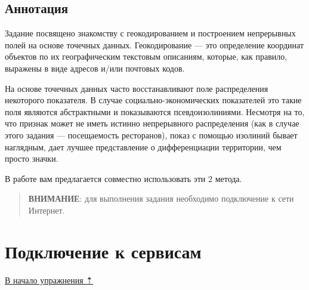 \documentclass[12pt,]{book}
\begin{document}
\hypertarget{geocoding-annotation}{%
\subsection{Аннотация}\label{geocoding-annotation}}

Задание посвящено знакомству с геокодированием и построением непрерывных полей на основе точечных данных. Геокодирование --- это определение координат объектов по их географическим текстовым описаниям, которые, как правило, выражены в виде адресов и/или почтовых кодов.

На основе точечных данных часто восстанавливают поле распределения некоторого показателя. В случае социально-экономических показателей это такие поля являются абстрактными и показываются псевдоизолиниями. Несмотря на то, что признак может не иметь истинно непрерывного распределения (как в случае этого задания --- посещаемость ресторанов), показ с помощью изолиний бывает наглядным, дает лучшее представление о дифференциации территории, чем просто значки.

В работе вам предлагается совместно использовать эти 2 метода.

\begin{quote}
\textbf{ВНИМАНИЕ}: для выполнения задания необходимо подключение к сети
Интернет.
\end{quote}

\hypertarget{geocoding-connection}{%
\section{Подключение к сервисам}\label{geocoding-connection}}

\protect\hyperlink{geocoding}{В начало упражнения ⇡}
\end{document}

